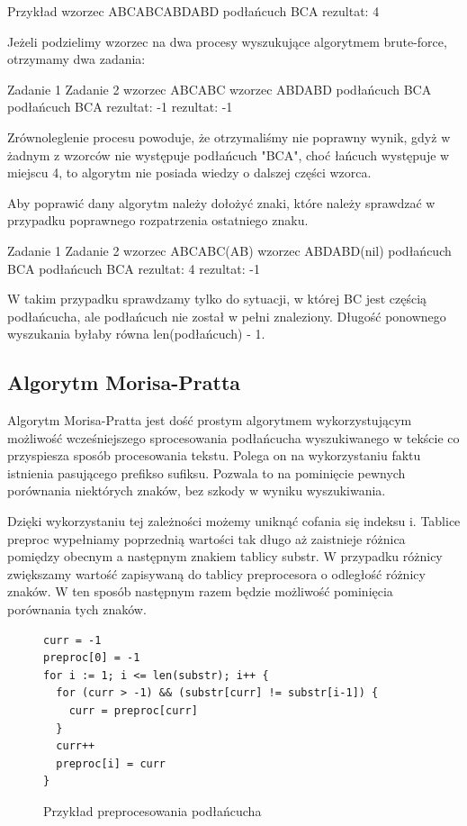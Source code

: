 Przykład
wzorzec     ABCABCABDABD
podłańcuch  BCA
rezultat:   4

Jeżeli podzielimy wzorzec na dwa procesy wyszukujące algorytmem brute-force,
otrzymamy dwa zadania:

Zadanie 1               Zadanie 2
wzorzec     ABCABC      wzorzec     ABDABD
podłańcuch  BCA         podłańcuch  BCA
rezultat:   -1          rezultat:   -1

Zrównoleglenie procesu powoduje, że otrzymaliśmy nie poprawny wynik, gdyż w 
żadnym z wzorców nie występuje podłańcuch "BCA", choć łańcuch występuje w 
miejscu 4, to algorytm nie posiada wiedzy o dalszej części wzorca.

Aby poprawić dany algorytm należy dołożyć znaki, które należy sprawdzać w 
przypadku poprawnego rozpatrzenia ostatniego znaku.

Zadanie 1               Zadanie 2
wzorzec     ABCABC(AB)  wzorzec     ABDABD(nil)
podłańcuch  BCA         podłańcuch  BCA
rezultat:   4           rezultat:   -1

W takim przypadku sprawdzamy tylko do sytuacji, w której BC jest częścią
podłańcucha, ale podłańcuch nie został w pełni znaleziony. Długość ponownego 
wyszukania byłaby równa len(podłańcuch) - 1.

\subsection{Algorytm Morisa-Pratta}

Algorytm Morisa-Pratta jest dość prostym algorytmem wykorzystującym możliwość
wcześniejszego sprocesowania podłańcucha wyszukiwanego w tekście co przyspiesza
sposób procesowania tekstu. Polega on na wykorzystaniu faktu istnienia pasującego
prefikso sufiksu. Pozwala to na pominięcie pewnych porównania niektórych znaków,
bez szkody w wyniku wyszukiwania.

Dzięki wykorzystaniu tej zależności możemy uniknąć cofania się indeksu i. 
Tablice preproc wypełniamy poprzednią wartości tak długo aż zaistnieje różnica 
pomiędzy obecnym a następnym znakiem tablicy substr. W przypadku różnicy 
zwiększamy wartość zapisywaną do tablicy preprocesora o odległość różnicy znaków.
W ten sposób następnym razem będzie możliwość pominięcia porównania tych znaków.

\begin{figure}[h]
  \centering
  \begin{lstlisting}
curr = -1
preproc[0] = -1
for i := 1; i <= len(substr); i++ {
  for (curr > -1) && (substr[curr] != substr[i-1]) {
    curr = preproc[curr]
  }
  curr++
  preproc[i] = curr
}
  \end{lstlisting}
  \caption{Przykład preprocesowania podłańcucha }
  \label{fig:code:preprocessMorisPratt}
\end{figure}

